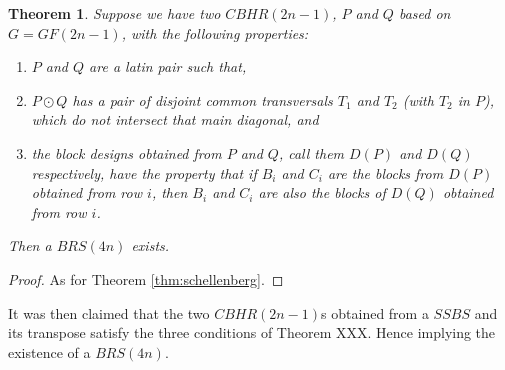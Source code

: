 \documentclass[11pt, a4paper]{book}\usepackage[]{graphicx}\usepackage[]{xcolor}
\newtheorem{theorem}{Theorem}
\begin{document}
\begin{theorem}
Suppose we have two $CBHR(2n - 1)$, $P$ and $Q$ based on
$G = GF(2n - 1)$, with the following properties:
\begin{enumerate}
  \item{$P$ and $Q$ are a latin pair such that,}
  \item{$P \odot Q$ has a pair of disjoint
    \emph{common transversals} $T_1$ and $T_2$
    (with $T_2$ in $P$), which do not intersect that main
    diagonal, and}
  \item{the block designs obtained from $P$ and $Q$, call
    them $D(P)$ and $D(Q)$ respectively, have the property
    that if $B_i$ and $C_i$ are the blocks from $D(P)$
    obtained from row $i$, then $B_i$ and $C_i$
    are also the blocks of $D(Q)$ obtained from row $i$.}
\end{enumerate}

Then a $BRS(4n)$ exists.
\end{theorem}

\begin{proof}
As for Theorem \ref{thm:schellenberg}.
\end{proof}

It was then claimed that the two $CBHR(2n - 1)$s obtained from
a $SSBS$ and its transpose satisfy the three conditions of
Theorem XXX. Hence implying the existence of a $BRS(4n)$.
\end{document}
